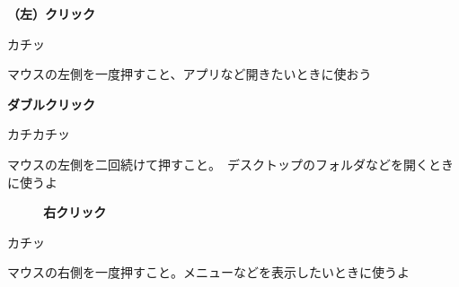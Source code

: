 \documentclass[a4paper,12pt]{jarticle}
\begin{document}
\begin{minipage}{\textwidth}
  \begin{minipage}{5.562cm}
    \centering
    \textbf{（左）クリック}
    \flushleft

    カチッ\\
    \centering

    \flushleft
    マウスの左側を一度押すこと、アプリなど開きたいときに使おう
  \end{minipage}
  \begin{minipage}{5.562cm}
    \centering
    \textbf{ダブルクリック}
    \flushleft

    カチカチッ\\
    \centering


    \flushleft
    マウスの左側を二回続けて押すこと。　デスクトップのフォルダなどを開くときに使うよ
  \end{minipage}
  \begin{minipage}{5.562cm}
    \centering
    \textbf{~~~~~右クリック}
    \flushleft

    \hspace{3cm} カチッ\\
    \centering


    \flushleft
    マウスの右側を一度押すこと。メニューなどを表示したいときに使うよ
  \end{minipage}
\end{minipage}
\end{document}

